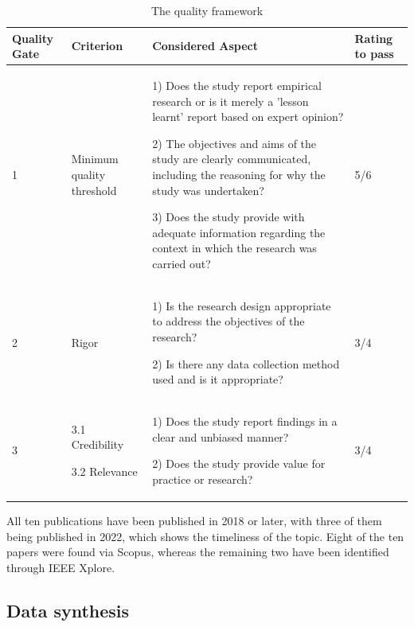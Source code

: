 \documentclass[a4paper,11pt,article,oneside]{memoir}
\begin{document}
\begin{table}
    \renewcommand{\arraystretch}{1.5}
    \caption[]{The quality framework}
    \begin{tabular}{|p{0.7cm}|p{2cm}|p{10cm}|p{1.5cm}|}
        \hline
        Quality Gate & Criterion & Considered Aspect & Rating to pass \\ 

        \hline

        1 & Minimum quality threshold & 
        
        1) Does the study report empirical research or is it merely a 'lesson learnt' report based on expert opinion?

        2) The objectives and aims of the study are clearly communicated, including the reasoning for why the study was undertaken?

        3) Does the study provide with adequate information regarding the context in which the research was carried out?
        & 5/6 \\ 
        \hline
        2 & Rigor & 
        
        1) Is the research design appropriate to address the objectives of the research?

        2) Is there any data collection method used and is it appropriate?
        & 3/4 \\ 
        \hline  
        3 &
        3.1 Credibility 

        3.2 Relevance 
        & 
        1) Does the study report findings in a clear and unbiased manner?

        2) Does the study provide value for practice or research?
        & 
        3/4 \\ 
        \hline   
    \end{tabular}
    \label{qualityFramework}
\end{table}





All ten publications have been published in 2018 or later, with three of them being published in 2022, which shows the timeliness of the topic. Eight of the ten papers were found via Scopus, whereas the remaining two have been identified through IEEE Xplore. 

\subsection{Data synthesis}
\end{document}
